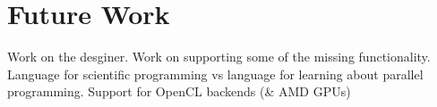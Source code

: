 \section{Future Work}

Work on the desginer. Work on supporting some of the missing functionality. Language for scientific programming vs language for learning about parallel programming. Support for OpenCL backends (\& AMD GPUs)
